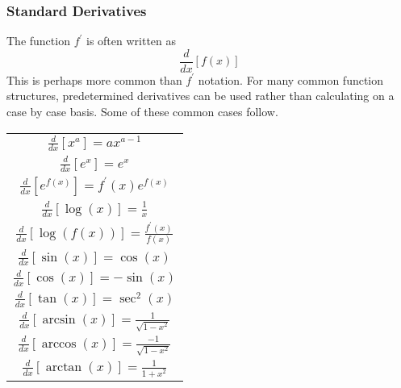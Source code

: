\documentclass[12pt]{report}
\begin{document}
\begin{flushleft}
\subsubsection*{Standard Derivatives}
The function \(f^\prime\) is often written as 
\[\frac{d}{dx}[f(x)]\]
This is perhaps more common than \(f^\prime\) notation. For many common 
function structures, predetermined derivatives can be used rather than 
calculating on a case by case basis. Some of these common cases follow.
\begin{center}
    \begin{tabular}{||c||}
        \(\frac{d}{dx}[x^a] = ax^{a-1}\) \\[7pt]
        \(\frac{d}{dx}[e^x] = e^x\) \\[7pt]
        \(\frac{d}{dx}[e^{f(x)}] = f^\prime(x)e^{f(x)}\) \\[7pt]
        \(\frac{d}{dx}[\log(x)] = \frac{1}{x}\) \\[7pt]
        \(\frac{d}{dx}[\log(f(x))] = \frac{f^\prime(x)}{f(x)}\) \\[7pt]
        \(\frac{d}{dx}[\sin(x)] = \cos(x)\) \\[7pt]
        \(\frac{d}{dx}[\cos(x)] = -\sin(x)\) \\[7pt]
        \(\frac{d}{dx}[\tan(x)] = \sec^2(x)\) \\[7pt]
        \(\frac{d}{dx}[\arcsin(x)] = \frac{1}{\sqrt{1 - x^2}}\) \\[7pt]
        \(\frac{d}{dx}[\arccos(x)] = \frac{-1}{\sqrt{1-x^2}}\) \\[7pt]
        \(\frac{d}{dx}[\arctan(x)] = \frac{1}{1 + x^2}\) \\[7pt]
    \end{tabular}
\end{center}


\end{flushleft}
\end{document}
